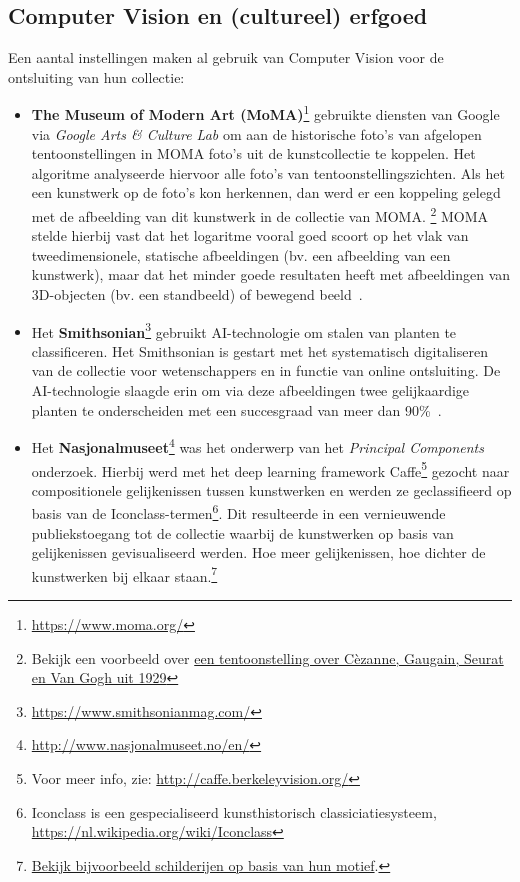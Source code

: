\documentclass[fleqn,10pt]{voorstel}
\begin{document}
\subsection{Computer Vision en (cultureel) erfgoed}
Een aantal instellingen maken al gebruik van Computer Vision voor de ontsluiting van hun collectie:
\begin{itemize}
	\item \textbf{The Museum of Modern Art (MoMA)}\footnote{\url{https://www.moma.org/}} gebruikte diensten van Google via \emph{Google Arts \& Culture Lab} om aan de historische foto's van afgelopen tentoonstellingen in MOMA foto's uit de kunstcollectie te koppelen. Het algoritme analyseerde hiervoor alle foto's van tentoonstellingszichten. Als het een kunstwerk op de foto's kon herkennen, dan werd er een koppeling gelegd met de afbeelding van dit kunstwerk in de collectie van MOMA. \footnote{Bekijk een voorbeeld over \href{https://www.moma.org/calendar/exhibitions/1767/installation_images/10473}{een tentoonstelling over C\`{e}zanne, Gaugain, Seurat en Van Gogh uit 1929}} MOMA stelde hierbij vast dat het logaritme vooral goed scoort op het vlak van tweedimensionele, statische afbeeldingen (bv. een afbeelding van een kunstwerk), maar dat het minder goede resultaten heeft met afbeeldingen van 3D-objecten (bv. een standbeeld) of bewegend beeld~\autocite{MOMA2018?}.
	\item Het \textbf{Smithsonian}\footnote{\url{https://www.smithsonianmag.com/}} gebruikt AI-technologie om stalen van planten te classificeren. Het Smithsonian is gestart met het systematisch digitaliseren van de collectie voor wetenschappers en in functie van online ontsluiting. De AI-technologie slaagde erin om via deze afbeeldingen twee gelijkaardige planten te onderscheiden met een succesgraad van meer dan 90\%~\autocite{Smith2017}.
	\item Het \textbf{Nasjonalmuseet}\footnote{\url{http://www.nasjonalmuseet.no/en/}} was het onderwerp van het \emph{Principal Components} onderzoek. Hierbij werd met het deep learning framework Caffe\footnote{Voor meer info, zie: \url{http://caffe.berkeleyvision.org/}} gezocht naar compositionele gelijkenissen tussen kunstwerken en werden ze geclassifieerd op basis van de Iconclass-termen\footnote{Iconclass is een gespecialiseerd kunsthistorisch classiciatiesysteem, \url{https://nl.wikipedia.org/wiki/Iconclass}}. Dit resulteerde in een vernieuwende publiekstoegang tot de collectie waarbij de kunstwerken op basis van gelijkenissen gevisualiseerd werden. Hoe meer gelijkenissen, hoe dichter de kunstwerken bij elkaar staan.\footnote{\href{http://vy.nasjonalmuseet.no/?collection=painting_subject}{Bekijk bijvoorbeeld schilderijen op basis van hun motief}.} \autocites{Nasjonalmuseet2017?}{Westvang2017?}
\end{itemize}
\end{document}
